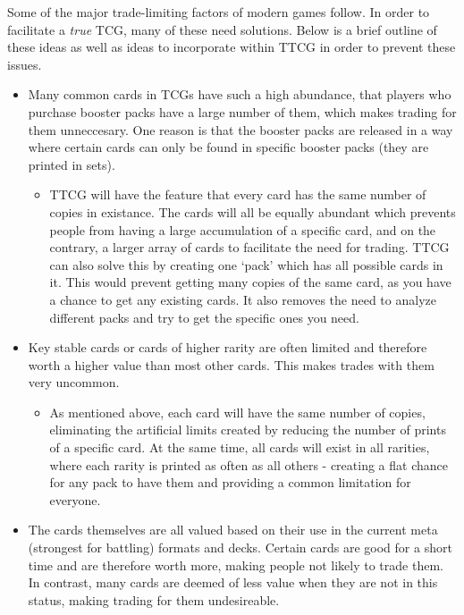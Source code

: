 Some of the major trade-limiting factors of modern games follow. In order to facilitate a \textit{true} TCG, many of these need solutions. Below is a brief outline of these ideas as well as ideas to incorporate within TTCG in order to prevent these issues.
\begin{itemize}
	\item Many common cards in TCGs have such a high abundance, that players who purchase booster packs have a large number of them, which makes trading for them unneccesary. One reason is that the booster packs are released in a way where certain cards can only be found in specific booster packs (they are printed in sets).
 	\begin{itemize}
		\item TTCG will have the feature that every card has the same number of copies in existance. The cards will all be equally abundant which prevents people from having a large accumulation of a specific card, and on the contrary, a larger array of cards to facilitate the need for trading. TTCG can also solve this by creating one `pack' which has all possible cards in it. This would prevent getting many copies of the same card, as you have a chance to get any existing cards. It also removes the need to analyze different packs and try to get the specific ones you need.
  	\end{itemize}
 	\item Key stable cards or cards of higher rarity are often limited and therefore worth a higher value than most other cards. This makes trades with them very uncommon.
 	\begin{itemize}
		\item As mentioned above, each card will have the same number of copies, eliminating the artificial limits created by reducing the number of prints of a specific card. At the same time, all cards will exist in all rarities, where each rarity is printed as often as all others - creating a flat chance for any pack to have them and providing a common limitation for everyone.
  	\end{itemize}
  	\item The cards themselves are all valued based on their use in the current meta (strongest for battling) formats and decks. Certain cards are good for a short time and are therefore worth more, making people not likely to trade them. In contrast, many cards are deemed of less value when they are not in this status, making trading for them undesireable.
 	\begin{itemize}

\end{itemize}
\end{itemize}
